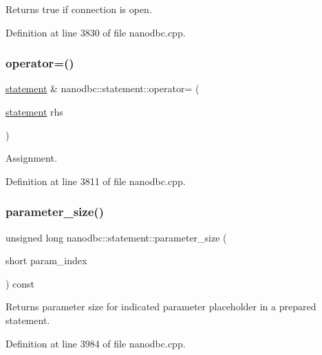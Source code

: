 Returns true if connection is open. 



Definition at line 3830 of file nanodbc.\+cpp.

\mbox{\label{classnanodbc_1_1statement_aaaa08f3783cb111c4426d42ae8d1ecd3}} 
\subsubsection{\texorpdfstring{operator=()}{operator=()}}
{\footnotesize\ttfamily \mbox{\hyperlink{classnanodbc_1_1statement}{statement}} \& nanodbc\+::statement\+::operator= (\begin{DoxyParamCaption}\item[{\mbox{\hyperlink{classnanodbc_1_1statement}{statement}}}]{rhs }\end{DoxyParamCaption})}



Assignment. 



Definition at line 3811 of file nanodbc.\+cpp.

\mbox{\label{classnanodbc_1_1statement_aef87fd2e1a1b307f212755fdab1dad07}} 
\subsubsection{\texorpdfstring{parameter\_size()}{parameter\_size()}}
{\footnotesize\ttfamily unsigned long nanodbc\+::statement\+::parameter\+\_\+size (\begin{DoxyParamCaption}\item[{short}]{param\+\_\+index }\end{DoxyParamCaption}) const}



Returns parameter size for indicated parameter placeholder in a prepared statement. 



Definition at line 3984 of file nanodbc.\+cpp.

\mbox{\label{classnanodbc_1_1statement_a7af565aeec0737be62c1a458deddd606}} 
